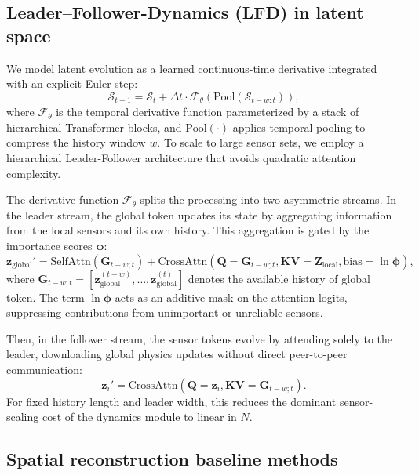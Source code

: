 \documentclass[pdflatex,sn-nature]{sn-jnl}%
\begin{document}
\subsection*{Leader–Follower-Dynamics (LFD) in latent space}
\label{subsec: Propagator}

We model latent evolution as a learned continuous-time derivative integrated with an explicit Euler step:
\begin{equation}
    \mathcal{S}_{t+1} = \mathcal{S}_t + \Delta t \cdot \mathcal{F}_\theta(\text{Pool}(\mathcal{S}_{t-w:t})),
\end{equation}
where $\mathcal{F}_\theta$ is the temporal derivative function parameterized by a stack of hierarchical Transformer blocks, and $\text{Pool}(\cdot)$ applies temporal pooling to compress the history window $w$.
To scale to large sensor sets, we employ a hierarchical Leader-Follower architecture that avoids quadratic attention complexity.

The derivative function $\mathcal{F}_\theta$ splits the processing into two asymmetric streams.
In the leader stream, the global token updates its state by aggregating information from the local sensors and its own history. 
This aggregation is gated by the importance scores $\boldsymbol{\phi}$:
\begin{equation}
    \mathbf{z}_{\text{global}}' = \text{SelfAttn}(\mathbf{G}_{t-w;t}) + \text{CrossAttn}(\mathbf{Q}=\mathbf{G}_{t-w;t}, \mathbf{KV}=\mathbf{Z}_{\text{local}}, \text{bias}=\ln \boldsymbol{\phi}),
\end{equation}
where $\mathbf{G}_{t-w;t}=[\mathbf{z}_{\text{global}}^{(t-w)},\dots,\mathbf{z}_{\text{global}}^{(t)}]$ denotes the available history of global token.
The term $\ln \boldsymbol{\phi}$ acts as an additive mask on the attention logits, suppressing contributions from unimportant or unreliable sensors.
    
Then, in the follower stream, the sensor tokens evolve by attending solely to the leader, downloading global physics updates without direct peer-to-peer communication:
\begin{equation}
    \mathbf{z}_{i}' = \text{CrossAttn}(\mathbf{Q}=\mathbf{z}_i, \mathbf{KV}=\mathbf{G}_{t-w;t}).
\end{equation}
For fixed history length and leader width, this reduces the dominant sensor-scaling cost of the dynamics module to linear in $N$.

\subsection*{Spatial reconstruction baseline methods}
\label{subsec: Spatial_Baseline}
\end{document}
